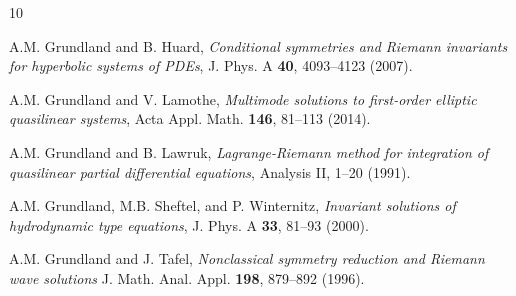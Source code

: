 \documentclass{birkjour}
\theoremstyle{definition}
\theoremstyle{remark}
\numberwithin{equation}{section}
\numberwithin{equation}{section}
\numberwithin{thm}{section}
\numberwithin{equation}{section}
\numberwithin{thm}{section}
\begin{document}
\begin{thebibliography}{10}
	
	
	A.M. Grundland and B. Huard, {\it Conditional symmetries and Riemann invariants for hyperbolic systems of PDEs}, J. Phys. A {\bf 40}, 4093--4123  (2007).
	
	A.M. Grundland and V. Lamothe, {\it Multimode solutions to first-order elliptic quasilinear systems}, Acta Appl. Math. {\bf 146},   81--113 (2014).
	
	
	
	
	A.M. Grundland and B. Lawruk, {\it Lagrange-Riemann method for integration of quasilinear partial differential equations}, Analysis II, 1--20 (1991).
	
	
	A.M. Grundland, M.B. Sheftel, and P. Winternitz, {\it Invariant solutions of hydrodynamic type equations}, J. Phys. A {\bf 33}, 81--93 (2000).
	
	
	A.M. Grundland and J. Tafel, {\it Nonclassical symmetry reduction and Riemann wave solutions} J. Math. Anal. Appl. {\bf 198}, 879--892 (1996). 
	

\end{thebibliography}
\end{document}
